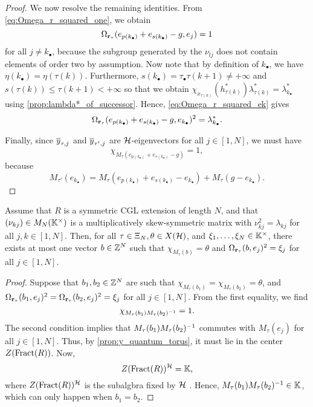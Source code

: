 \begin{proof}
	We now resolve the remaining identities. From \cref{eq:Omega_r_squared_one}, we obtain
	\begin{equation*}
		\Omega_{\mathbf{r}_\tau}(e_{p(k_\bullet)} + e_{s(k_\bullet)} -g, e_j) = 1
	\end{equation*}
	for all $j\neq k_\bullet$, because the subgroup generated by the $\nu_{lj}$ does not contain elements of order two by assumption. Now note that by definition of $k_\bullet$,
	we have $\eta(k_\bullet) = \eta(\tau(k))$. Furthermore, $s(k_\bullet) =
		\tau_\bullet\tau(k+1) \neq + \infty$ and $s(\tau(k)) \leq \tau(k+1) < + \infty$ so that
	we obtain $\chi_{x_{\tau(k)}}(h^*_{\tau(k)})\lambda^*_{\tau(k)} =
		\lambda^*_{k_\bullet}$ using \cref{prop:lambda*_of_successor}. Hence, \cref{eq:Omega_r_squared_ek} gives
	\begin{equation*}
		\Omega_{\mathbf{r}_\tau}(e_{p(k_\bullet)} + e_{s(k_\bullet)} - g, e_{k_\bullet})^2 = \lambda_{k_\bullet}^*.
	\end{equation*}

	Finally, since $\overline{y}_{\tau, j}$ and $\overline{y}_{\tau', j}$ are $\mathcal{H}$-eigenvectors for all
	$j\in [1, N]$, we must have
	\begin{equation*}
		\chi_{M_\tau(e_{p(k_\bullet)} + e_{s(k_\bullet)} - g)} = 1,
	\end{equation*}
	because
	\begin{equation*}
		M_{\tau'}(e_{k_\bullet}) =
		M_\tau(e_{p(k_\bullet)} + e_{s(k_\bullet)} - e_{k_\bullet}) + M_\tau(g-e_{k_\bullet}).
	\end{equation*}
\end{proof}

\begin{lemma}\label{lem:unique_b}
	Assume that $R$ is a symmetric CGL extension of length $N$, and that $(\nu_{kj}) \in M_N(\mathbb{K}^\times)$ is a multiplicatively skew-symmetric matrix with $\nu_{kj}^2 = \lambda_{kj}$ for all $j,k \in [1, N]$. Then, for all $\tau \in \Xi_N, \theta \in X(\mathcal{H})$, and $\xi_1, \dots, \xi_N \in \mathbb{K}^\times$, there exists at most one vector $b\in \mathbb{Z}^N$ such that $\chi_{M_\tau(b)} = \theta$ and $\Omega_{\mathbf{r}_\tau}(b, e_j)^2 = \xi_j$ for all $j \in [1, N]$.
\end{lemma}
\begin{proof}
	Suppose that $b_1, b_2 \in \mathbb{Z}^N$ are such that $\chi_{M_\tau(b_1)} = \chi_{M_\tau(b_2)} = \theta$, and $\Omega_{\mathbf{r}_\tau}(b_1, e_j)^2 = \Omega_{\mathbf{r}_\tau}(b_2, e_j)^2 = \xi_j$ for all $j \in [1, N]$. From the first equality, we find
	\begin{equation*}
		\chi_{M_\tau(b_1)M_\tau(b_2)^{-1}} = 1.
	\end{equation*}
	The second condition implies that $M_\tau(b_1)M_\tau(b_2)^{-1}$ commutes with
	$M_\tau(e_j)$ for all $j\in [1, N]$. Thus, by \cref{prop:y_quantum_torus}, it must lie
	in the center $Z(\operatorname{Fract}(R))$. Now,
	\begin{equation*}
		Z(\operatorname{Fract}(R))^{\mathcal{H}} = \mathbb{K},
	\end{equation*}
	where $Z(\operatorname{Fract}(R))^{\mathcal{H}}$ is the subalgbra fixed by $\mathcal{H}$ \cite[Theorem II.6.4]{GoodearlBrown2002LecturesAQC}. Hence, $M_\tau(b_1)M_\tau(b_2)^{-1} \in \mathbb{K}$, which can only happen when $b_1 = b_2$.
\end{proof}

